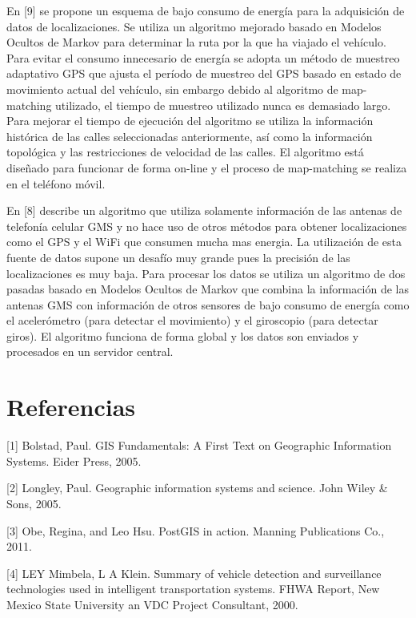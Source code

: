 \documentclass[final,fmstyle]{fpunathesis}
\begin{document}
En [9] se propone un esquema de bajo consumo de energía para la adquisición de datos de localizaciones. Se utiliza un algoritmo mejorado basado en Modelos Ocultos de Markov para determinar la ruta por la que ha viajado el vehículo. Para evitar el consumo innecesario de energía se adopta un método de muestreo adaptativo GPS que ajusta el período de muestreo del GPS basado en estado de movimiento actual del vehículo, sin embargo debido al algoritmo de map-matching utilizado, el tiempo de muestreo utilizado nunca es demasiado largo. Para mejorar el tiempo de ejecución del algoritmo se utiliza la información histórica de las calles seleccionadas anteriormente, así como la información topológica y las restricciones de velocidad de las calles. El algoritmo está diseñado para funcionar de forma on-line y el proceso de map-matching se realiza en el teléfono móvil.

En [8] describe un algoritmo que utiliza solamente información de las antenas de telefonía celular GMS y no hace uso de otros métodos para obtener localizaciones como el GPS y el WiFi que consumen mucha mas energia. La utilización de esta fuente de datos supone un desafío muy grande pues la precisión de las localizaciones es muy baja. Para procesar los datos se utiliza un algoritmo de dos pasadas basado en Modelos Ocultos de Markov que combina la información de las antenas GMS con información de otros sensores de bajo consumo de energía como el acelerómetro (para detectar el movimiento) y el giroscopio (para detectar giros). El algoritmo funciona de forma global y los datos son enviados y procesados en un servidor central.



\chapter{Referencias}

[1] Bolstad, Paul. GIS Fundamentals: A First Text on Geographic Information Systems. Eider Press, 2005.

[2] Longley, Paul. Geographic information systems and science. John Wiley \& Sons, 2005.

[3] Obe, Regina, and Leo Hsu. PostGIS in action. Manning Publications Co., 2011.

[4] LEY Mimbela, L A Klein. Summary of vehicle detection and surveillance technologies used in intelligent transportation systems. FHWA Report, New Mexico State University an VDC Project Consultant, 2000.
\end{document}
